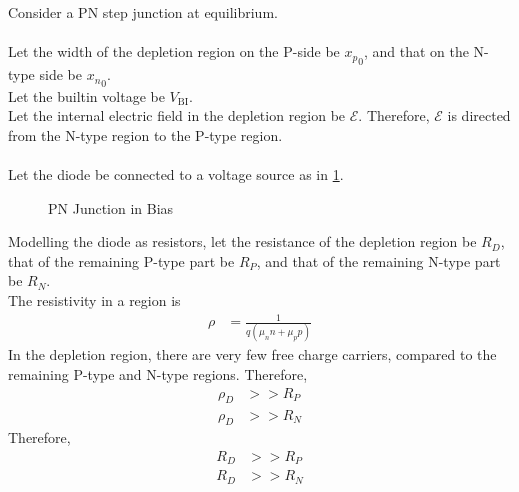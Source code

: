 \documentclass[titlepage, fleqn, a4paper, 12pt, twoside]{article}
\theoremstyle{definition}
\theoremstyle{theorem}
\begin{document}
Consider a PN step junction at equilibrium.\\
~\\
Let the width of the depletion region on the P-side be ${x_p}_0$, and that on the N-type side be ${x_n}_0$.\\
Let the builtin voltage be $V_{\text{BI}}$.\\
Let the internal electric field in the depletion region be $\mathcal{E}$.
Therefore, $\mathcal{E}$ is directed from the N-type region to the P-type region.\\
~\\
Let the diode be connected to a voltage source as in \cref{fig:PN_Junction_in_Bias}.
\begin{figure}[h]
	\centering
	\caption{PN Junction in Bias}
	\label{fig:PN_Junction_in_Bias}
\end{figure}
Modelling the diode as resistors, let the resistance of the depletion region be $R_D$, that of the remaining P-type part be $R_P$, and that of the remaining N-type part be $R_N$.\\
The resistivity in a region is
\begin{align*}
	\rho & = \frac{1}{q (\mu_n n + \mu_p p)}
\end{align*}
In the depletion region, there are very few free charge carriers, compared to the remaining P-type and N-type regions.
Therefore,
\begin{align*}
	\rho_D & >> R_P \\
	\rho_D & >> R_N
\end{align*}
Therefore,
\begin{align*}
	R_D & >> R_P \\
	R_D & >> R_N
\end{align*}
\end{document}
